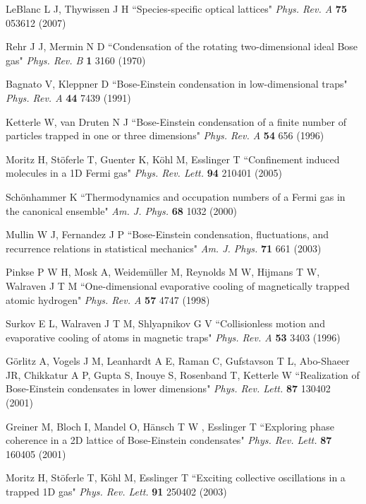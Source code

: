 \documentclass[pra,letterpaper,twocolumn,showpacs,superscriptaddress]{revtex4}
\begin{document}
\begin{thebibliography}{300}
 LeBlanc L J, Thywissen J H
``Species-specific optical lattices" {\it Phys. Rev. A} \textbf{75} 053612 (2007)

  Rehr J J, Mermin N D 
``Condensation of the rotating two-dimensional ideal Bose gas" {\it Phys. Rev. B} \textbf{1} 3160 (1970)

 Bagnato V, Kleppner D
``Bose-Einstein condensation in low-dimensional traps" {\it Phys. Rev. A} \textbf{44} 7439 (1991)

 Ketterle W, van Druten N J
``Bose-Einstein condensation of a finite number of particles trapped in one or three dimensions"
{\it Phys. Rev. A} \textbf{54} 656 (1996)

 Moritz H, St\"{o}ferle T, Guenter K, K\"{o}hl M, Esslinger T
``Confinement induced molecules in a 1D Fermi gas" {\it Phys. Rev. Lett.} \textbf{94} 210401 (2005)

 Sch\"{o}nhammer K 
``Thermodynamics and occupation numbers of a Fermi gas in the canonical ensemble"
{\it Am. J. Phys.} \textbf{68} 1032 (2000)

 Mullin W J, Fernandez J P
``Bose-Einstein condensation, fluctuations, and recurrence relations in statistical mechanics"
{\it Am. J. Phys.} \textbf{71} 661 (2003)

 Pinkse P W H, Mosk A, Weidem\"uller M, Reynolds M W, Hijmans T W, Walraven J T M
``One-dimensional evaporative cooling of magnetically trapped atomic hydrogen"
{\it Phys. Rev. A} \textbf{57} 4747 (1998)

 Surkov E L, Walraven J T M, Shlyapnikov G V
``Collisionless motion and evaporative cooling of atoms in magnetic traps"
{\it Phys. Rev. A} \textbf{53} 3403 (1996)

 G\"orlitz A, Vogels J M, Leanhardt A E, Raman C, Gufstavson T L, Abo-Shaeer JR, 
Chikkatur A P, Gupta S, Inouye S, Rosenband T, Ketterle W
``Realization of Bose-Einstein condensates in lower dimensions" {\it Phys. Rev. Lett.} \textbf{87} 130402 (2001)

 Greiner M, Bloch I, Mandel O, H\"ansch T W , Esslinger T 
``Exploring phase coherence in a 2D lattice of Bose-Einstein condensates"
{\it Phys. Rev. Lett.} \textbf{87} 160405 (2001)

 Moritz H, St\"oferle T, K\"ohl M, Esslinger T
``Exciting collective oscillations in a trapped 1D gas"
{\it Phys. Rev. Lett.} \textbf{91} 250402 (2003)


\end{thebibliography}
\end{document}
